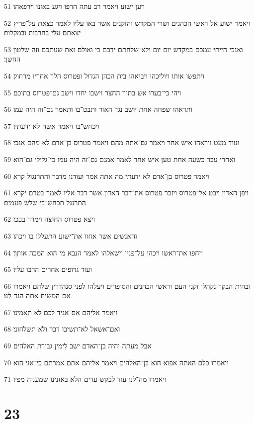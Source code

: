 \par 51 ויען ישוע ויאמר רב עתה הרפו ויגע באזנו וירפאהו׃
\par 52 ויאמר ישוע אל ראשי הכהנים ושרי המקדש והזקנים אשר באו עליו לאמר כצאת על־פריץ יצאתם עלי בחרבות ובמקלות׃
\par 53 ואנכי הייתי עמכם במקדש יום יום ולא־שלחתם ידכם בי ואולם זאת שעתכם וזה שלטון החשך׃
\par 54 ויתפשו אותו ויוליכהו ויביאהו בית הכהן הגדול ופטרוס הלך אחריו מרחוק׃
\par 55 ויהי כי־בערו אש בתוך החצר וישבו יחדו וישב גם־פטרוס בתוכם׃
\par 56 ותראהו שפחה אחת יושב נגד האור ותבט־בו ותאמר גם־זה היה עמו׃
\par 57 ויכחש־בו ויאמר אשה לא ידעתיו׃
\par 58 ועוד מעט ויראהו איש אחר ויאמר גם־אתה מהם ויאמר פטרוס בן־אדם לא מהם אנכי׃
\par 59 ואחרי עבר כשעה אחת טען איש אחר לאמר אמנם גם־זה היה עמו כי־גלילי גם־הוא׃
\par 60 ויאמר פטרוס בן־אדם לא ידעתי מה אתה אמר ועודנו מדבר והתרנגול קרא׃
\par 61 ויפן האדון ויבט אל־פטרוס ויזכר פטרוס את־דבר האדון אשר דבר אליו לאמר בטרם יקרא התרנגל תכחש־בי שלש פעמים׃
\par 62 ויצא פטרוס החוצה וימרר בבכי׃
\par 63 והאנשים אשר אחזו את־ישוע התעללו בו ויכהו׃
\par 64 ויחפו את־ראשו ויכהו על־פניו וישאלהו לאמר הנבא מי הוא המכה אותך׃
\par 65 ועוד גדופים אחרים הרבו עליו׃
\par 66 ובהית הבקר נקהלו זקני העם וראשי הכהנים והסופרים ויעלהו לפני סנהדרין שלהם ויאמרו אם המשיח אתה הגד־לנו׃
\par 67 ויאמר אליהם אם־אגיד לכם לא תאמינו׃
\par 68 ואם־אשאל לא־תשיבו דבר ולא תשלחוני׃
\par 69 אבל מעתה יהיה בן־האדם ישב לימין גבורת האלהים׃
\par 70 ויאמרו כלם האתה אפוא הוא בן־האלהים ויאמר אליהם אתם אמרתם כי־אני הוא׃
\par 71 ויאמרו מה־לנו עוד לבקש עדים הלא באזנינו שמענוה מפיו׃

\chapter{23}

